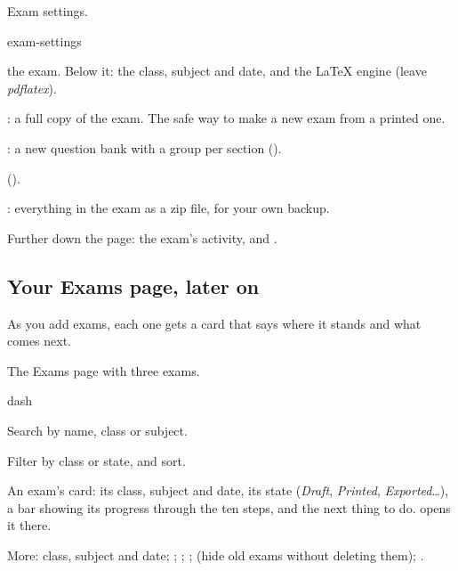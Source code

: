 \documentclass[11pt]{article}
\begin{document}
\begin{keep}
\begin{guidefig}{Exam settings.}
\begin{shot}{exam-settings}
\end{shot}
\end{guidefig}
\begin{callouts}
  \item {} the exam. Below it: the class, subject and date, and the LaTeX engine (leave \emph{pdflatex}).
  \item {}: a full copy of the exam. The safe way to make a new exam from a printed one.
  \item {}: a new question bank with a group per section ().
  \item {} ().
  \item {}: everything in the exam as a zip file, for your own backup.
\end{callouts}
\end{keep}
Further down the page: the exam's activity,  and .

\subsection{Your Exams page, later on}

As you add exams, each one gets a card that says where it stands and what comes next.

\begin{keep}
\begin{guidefig}{The Exams page with three exams.}
\begin{shot}{dash}
\end{shot}
\end{guidefig}
\begin{callouts}
  \item Search by name, class or subject.
  \item Filter by class or state, and sort.
  \item An exam's card: its class, subject and date, its state (\emph{Draft}, \emph{Printed}, \emph{Exported}\ldots), a bar showing its progress through the ten steps, and the next thing to do.  opens it there.
  \item More: class, subject and date; ; ; ;  (hide old exams without deleting them); .
\end{callouts}
\end{keep}
\end{document}
